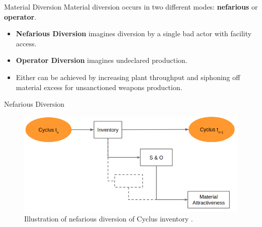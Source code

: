 \documentclass[final]{beamer}
\newlength{\onecolwid}
\newlength{\threecolwid}
\begin{document}
\begin{frame}[t]
\begin{columns}[t,totalwidth=\threecolwid]
\begin{column}{\onecolwid}
\begin{block}{Material Diversion}
        Material diversion occurs in two different modes: \textbf{nefarious} or \textbf{operator}.
        \begin{itemize}
        \item \textbf{Nefarious Diversion} imagines diversion by a single bad actor with facility access.
        \item \textbf{Operator Diversion} imagines undeclared production.
        \item Either can be achieved by increasing plant throughput and siphoning off material excess for unsanctioned weapons production.
        \end{itemize}
        
        
	\begin{block} {Nefarious Diversion}
		\begin{figure}
			\includegraphics[width=0.9\linewidth]{diversion1.png}
			\caption{Illustration of nefarious diversion of Cyclus inventory \cite{Yilmaz_2016}.}
		\end{figure}
		

\end{block}
\end{block}
\end{column}
\end{columns}
\end{frame}
\end{document}
